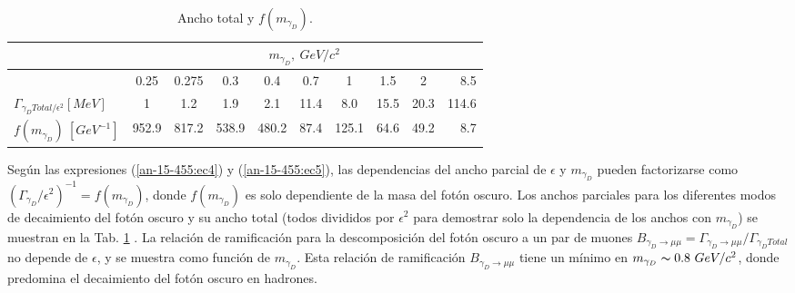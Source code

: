 \begin{table}[h!]
  \begin{center}
   \caption{Ancho total y $f(m_{\gamma_D})$.}
    \label{an-15-455:tb1}
    \begin{tabular}{|l|c|c|c|c|c|c|c|c|r|} %
		\hline 		
		&\multicolumn{9}{c|}{$m_{\gamma_D}, ~GeV/c^2$}\\		
		\hline 
		&0.25 & 0.275 & 0.3 & 0.4 & 0.7 & 1 & 1.5 & 2 & 8.5\\
		\hline       
       	$\Gamma_{\gamma_D Total/\epsilon^2}[MeV]$ & 1 & 1.2 & 1.9 & 2.1 & 11.4 & 8.0 & 15.5 & 20.3 & 114.6 \\
       	\hline 
       	$f(m_{\gamma_D})~[GeV^{-1}]$ & 952.9 & 817.2 & 538.9 & 480.2 & 87.4 & 125.1 & 64.6 & 49.2 & 8.7 \\
      	\hline      
    \end{tabular}
  \end{center}
\end{table}

Según las expresiones (\ref{an-15-455:ec4}) y (\ref{an-15-455:ec5}), las dependencias del ancho parcial de $\epsilon$ y $m_{\gamma_D}$ pueden factorizarse como $ (\Gamma_{\gamma_D}/\epsilon^2)^{-1}= f (m_{\gamma_D})$, donde $f (m_{\gamma_D})$ es solo dependiente de la masa del fotón oscuro. Los anchos parciales para los diferentes modos de decaimiento del fotón oscuro y su ancho total (todos divididos por $\epsilon^2$ para demostrar solo la dependencia de los anchos con $m_{\gamma_D}$) se muestran en la Tab. \ref{an-15-455:tb1} %
. La relación de ramificación para la descomposición del fotón oscuro a un par de muones $B_{\gamma_D\rightarrow \mu\mu} = \Gamma_{\gamma_D\rightarrow \mu\mu} /\Gamma_{\gamma_D Total}$ no depende de $\epsilon$, y se muestra %
como función de $m_{\gamma_D}$. Esta relación de ramificación $B_{\gamma_D\rightarrow\mu\mu}$ tiene un mínimo en $m_{\gamma_D}\thicksim 0.8 ~ GeV/ c^2$, donde predomina el decaimiento del fotón oscuro en hadrones. 

